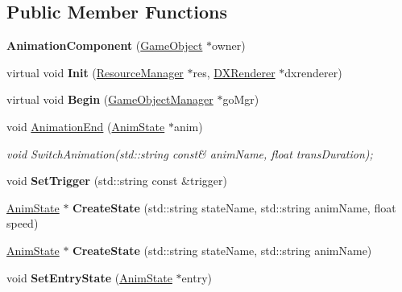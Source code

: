 \subsection*{Public Member Functions}
\begin{DoxyCompactItemize}
\item 
\mbox{\label{classAnimationComponent_a2759aea8d6d3e70f7b4f0f91eb68dbf2}} 
{\bfseries Animation\+Component} (\hyperlink{classGameObject}{Game\+Object} $\ast$owner)
\item 
\mbox{\label{classAnimationComponent_a7847ca35ed87a7d2156081ad41822de4}} 
virtual void {\bfseries Init} (\hyperlink{classResourceManager}{Resource\+Manager} $\ast$res, \hyperlink{classDXRenderer}{D\+X\+Renderer} $\ast$dxrenderer)
\item 
\mbox{\label{classAnimationComponent_ab079696aad04351fa60a12040aeffe58}} 
virtual void {\bfseries Begin} (\hyperlink{classGameObjectManager}{Game\+Object\+Manager} $\ast$go\+Mgr)
\item 
\mbox{\label{classAnimationComponent_a03636b1eaab7e1a4aaf05d6321ad2478}} 
void \hyperlink{classAnimationComponent_a03636b1eaab7e1a4aaf05d6321ad2478}{Animation\+End} (\hyperlink{structAnimState}{Anim\+State} $\ast$anim)
\begin{DoxyCompactList}\small\item\em void Switch\+Animation(std\+::string const\& anim\+Name, float trans\+Duration); \end{DoxyCompactList}\item 
\mbox{\label{classAnimationComponent_af826696c15c75e727360009e1ebd4d8d}} 
void {\bfseries Set\+Trigger} (std\+::string const \&trigger)
\item 
\mbox{\label{classAnimationComponent_afd02daaa324cf1a038aed3736c579f81}} 
\hyperlink{structAnimState}{Anim\+State} $\ast$ {\bfseries Create\+State} (std\+::string state\+Name, std\+::string anim\+Name, float speed)
\item 
\mbox{\label{classAnimationComponent_ad19e6c6a3b266d7987391be6d3ece4ea}} 
\hyperlink{structAnimState}{Anim\+State} $\ast$ {\bfseries Create\+State} (std\+::string state\+Name, std\+::string anim\+Name)
\item 
\mbox{\label{classAnimationComponent_ae63c07831f76d1c69a8be6dbd03f54a2}} 
void {\bfseries Set\+Entry\+State} (\hyperlink{structAnimState}{Anim\+State} $\ast$entry)
\end{DoxyCompactItemize}
